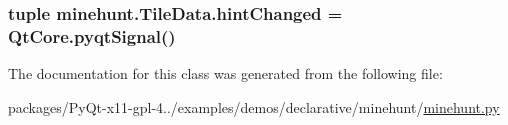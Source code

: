 \subsubsection[{hint\+Changed}]{\setlength{\rightskip}{0pt plus 5cm}tuple minehunt.\+Tile\+Data.\+hint\+Changed = Qt\+Core.\+pyqt\+Signal()\hspace{0.3cm}{\ttfamily [static]}}\label{classminehunt_1_1TileData_afd8841ca0a4027751b368b3df8001201}


The documentation for this class was generated from the following file\+:\begin{DoxyCompactItemize}
\item 
packages/\+Py\+Qt-\/x11-\/gpl-\/4../examples/demos/declarative/minehunt/\hyperlink{minehunt_8py}{minehunt.\+py}\end{DoxyCompactItemize}

